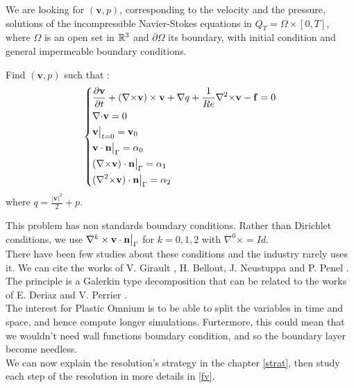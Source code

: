 We are looking for $(\mathbf{v},p)$, corresponding to the velocity and the pressure, solutions of the incompressible Navier-Stokes equations in $Q_T=\Omega\times[0,T]$, where $\Omega$ is an open set in ${\mathbb{R}}^3$ and $\partial\Omega$ its boundary, with initial condition and general impermeable boundary conditions.
\begin{pb}\label{depart}
Find $(\mathbf{v},p)$ such that :
\begin{equation*}
\left\{\begin{aligned}
&\frac{\partial \mathbf{v}}{\partial t} + ({\nabla\times}  \mathbf{v})\times \mathbf{v} + {\nabla} q + \frac{1}{Re}{\nabla^2\times}  \mathbf{v}-\mathbf{f} = 0\\
&{\nabla\cdot} \mathbf{v} = 0\\
&\mathbf{v}\big\rvert_{t=0} = \mathbf{v}_0\\
&\mathbf{v}\cdot \mathbf{n}{\big\rvert_{\Gamma}} = \alpha_0\\
&({\nabla\times}  \mathbf{v})\cdot \mathbf{n}{\big\rvert_{\Gamma}} = \alpha_1\\
&({\nabla^2\times}  \mathbf{v})\cdot \mathbf{n}{\big\rvert_{\Gamma}} = \alpha_2
\end{aligned}\right.
\end{equation*}
where $q = \frac{|\mathbf{v}|^2}{2}+p$.\\
\end{pb}
This problem has non standards boundary conditions. Rather than Dirichlet conditions, we use $\nabla^k\times\mathbf{v}\cdot\mathbf{n}{\big\rvert_{\Gamma}}$ for $k=0,1,2$ with $\nabla^0\times=Id$.\\
There have been few studies about these conditions and the industry rarely uses it. We can cite the works of V. Girault \cite{girault90-1}, H. Bellout, J. Neustuppa and P. Penel \cite{Penel2004}. The principle is a Galerkin type decomposition that can be related to the works of E. Deriaz and V. Perrier \cite{Deriaz2009249}.\\

The interest for Plastic Omnium is to be able to split the variables in time and space, and hence compute longer simulations. Furtermore, this could mean that we wouldn't need wall functions boundary condition, and so the boundary layer become needless.\\ 

We can now explain the resolution's strategy in the chapter \ref{strat}, then study each step of the resolution in more details in \ref{fv}.

